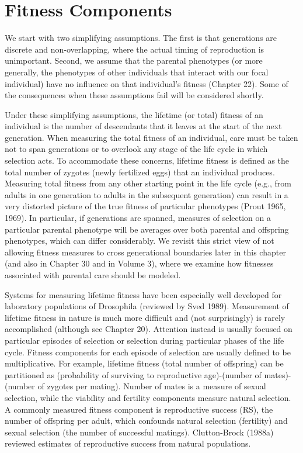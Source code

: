 \documentclass{article}
\begin{document}
\section{Fitness Components}
We start with two simplifying assumptions. The first is that generations are discrete and non-overlapping, where the actual timing of reproduction is unimportant. Second, we assume that the parental phenotypes (or more generally, the phenotypes of other individuals that interact with our focal individual) have no influence on that individual's fitness (Chapter 22). Some of the consequences when these assumptions fail will be considered shortly.

Under these simplifying assumptions, the lifetime (or total) fitness of an individual is the number of descendants that it leaves at the start of the next generation. When measuring the total fitness of an individual, care must be taken not to span generations or to overlook any stage of the life cycle in which selection acts. To accommodate these concerns, lifetime fitness is defined as the total number of zygotes (newly fertilized eggs) that an individual produces. Measuring total fitness from any other starting point in the life cycle (e.g., from adults in one generation to adults in the subsequent generation) can result in a very distorted picture of the true fitness of particular phenotypes (Prout 1965, 1969). In particular, if generations are spanned, measures of selection on a particular parental phenotype will be averages over both parental and offspring phenotypes, which can differ considerably. We revisit this strict view of not allowing fitness measures to cross generational boundaries later in this chapter (and also in Chapter 30 and in Volume 3), where we examine how fitnesses associated with parental care should be modeled.

Systems for measuring lifetime fitness have been especially well developed for laboratory populations of Drosophila (reviewed by Sved 1989). Measurement of lifetime fitness in nature is much more difficult and (not surprisingly) is rarely accomplished (although see Chapter 20). Attention instead is usually focused on particular episodes of selection or selection during particular phases of the life cycle. Fitness components for each episode of selection are usually defined to be multiplicative. For example, lifetime fitness (total number of offspring) can be partitioned as (probability of surviving to reproductive age)-(number of mates)-(number of zygotes per mating). Number of mates is a measure of sexual selection, while the viability and fertility components measure natural selection. A commonly measured fitness component is reproductive success (RS), the number of offspring per adult, which confounds natural selection (fertility) and sexual selection (the number of successful matings). Clutton-Brock (1988a) reviewed estimates of reproductive success from natural populations.
\end{document}
